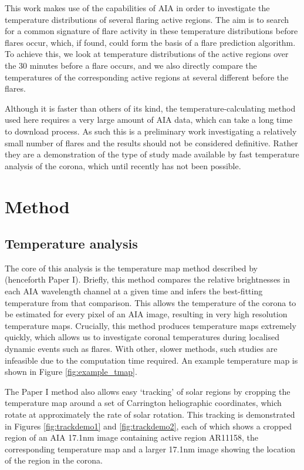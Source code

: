 \documentclass[referee,a4paper,12pt]{swsc}
\begin{document}
\begin{linenumbers}
This work makes use of the capabilities of AIA in order to investigate the temperature distributions of several flaring active regions.
The aim is to search for a common signature of flare activity in these temperature distributions before flares occur, which, if found, could form the basis of a flare prediction algorithm.
To achieve this, we look at temperature distributions of the active regions over the 30 minutes before a flare occurs, and we also directly compare the temperatures of the corresponding active regions at several different before the flares.

Although it is faster than others of its kind, the temperature-calculating method used here requires a very large amount of AIA data, which can take a long time to download process.
As such this is a preliminary work investigating a relatively small number of flares and the results should not be considered definitive.
Rather they are a demonstration of the type of study made available by fast temperature analysis of the corona, which until recently has not been possible.

\section{Method}
\subsection{Temperature analysis}
The core of this analysis is the temperature map method described by \cite{Leonard} (henceforth Paper I).
Briefly, this method compares the relative brightnesses in each AIA wavelength channel at a given time and infers the best-fitting temperature from that comparison.
This allows the temperature of the corona to be estimated for every pixel of an AIA image, resulting in very high resolution temperature maps.
Crucially, this method produces temperature maps extremely quickly, which allows us to investigate coronal temperatures during localised dynamic events such as flares.
With other, slower methods, such studies are infeasible due to the computation time required.
An example temperature map is shown in Figure \ref{fig:example_tmap}.

The Paper I method also allows easy `tracking' of solar regions by cropping the temperature map around a set of Carrington heliographic coordinates, which rotate at approximately the rate of solar rotation.
This tracking is demonstrated in Figures \ref{fig:trackdemo1} and \ref{fig:trackdemo2}, each of which shows a cropped region of an AIA 17.1nm image containing active region AR11158, the corresponding temperature map and a larger 17.1nm image showing the location of the region in the corona.


\end{linenumbers}
\end{document}
